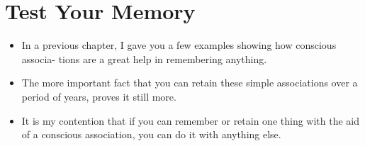     \section*{Test Your Memory}
        \begin{itemize}
            \item In a previous chapter, I
            gave you a few examples showing how conscious associa-
            tions are a great help in remembering anything.
            \item The more important fact that you can retain
            these simple associations over a period of years, proves it
            still more.
            \item It is my contention that if you can remember or retain
            one thing with the aid of a conscious association, you can
            do it with anything else.
        \end{itemize}

